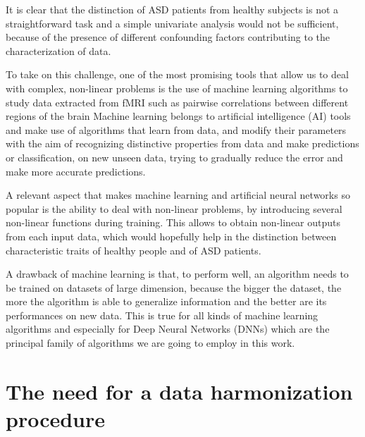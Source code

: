 \documentclass[11pt]{report}
\begin{document}
It is clear that the distinction of ASD patients from healthy subjects is not a straightforward task and a simple univariate analysis would not be sufficient, because of the presence of different confounding factors contributing to the characterization of data.

To take on this challenge, one of the most promising tools that allow us to deal with complex, non-linear problems is the use of machine learning algorithms to study data extracted from fMRI such as pairwise correlations between different regions of the brain
Machine learning belongs to artificial intelligence (AI) tools and make use of algorithms that learn from data, and modify their parameters with the aim of recognizing distinctive properties from data and make predictions or classification, on new unseen data, trying to gradually reduce the error and make more accurate predictions.

A relevant aspect that makes machine learning and artificial neural networks so popular is the ability to deal with non-linear problems, by introducing several non-linear functions during training.
This allows to obtain non-linear outputs from each input data, which would hopefully help in the distinction between characteristic traits of healthy people and of ASD patients.

A drawback of machine learning is that, to perform well, an algorithm needs to be trained on datasets of large dimension, because the bigger the dataset, the more the algorithm is able to generalize information and the better are its performances on new data.
This is true for all kinds of machine learning algorithms and especially for Deep Neural Networks (DNNs) which are the principal family of algorithms we are going to employ in this work.

\section{The need for a data harmonization procedure}
\end{document}
